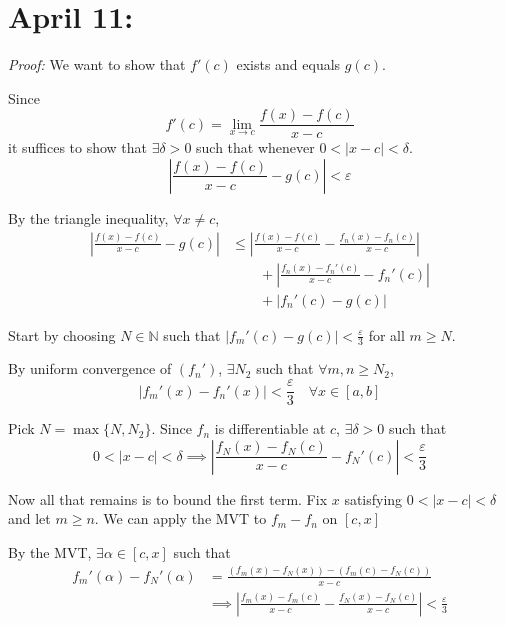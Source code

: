 \documentclass[12pt]{report}
\newcommand{\N}{\mathbb{N}}
\newcommand{\abs}[1]{\left\vert #1 \right\vert}
\newcommand{\ep}{\varepsilon}
\newenvironment*{tbox}[2][gray]{
    \begin{tcolorbox}[
        parbox=false,
        colback=#1!5!white,
        colframe=#1!75!black,
        breakable,
        title={#2}
    ]}
    {\end{tcolorbox}}
\begin{document}
\section{April 11:}
    \begin{tbox}{\textbf{Differentiable Limit Theorem:} Let $f_n \to f$ pointwise on the closed interval $[a, b]$ and assume that each $f_n$ is differentiable if $(f_n')$ converges uniformly on $[a, b]$ to a function $g$. Then $f$ is differentiable on $[a, b]$ and $f' = g$.}
        \emph{Proof:} We want to show that $f'(c)$ exists and equals $g(c)$. 

        Since 
        \[f'(c) = \lim_{x \to c} \frac{f(x) - f(c)}{x - c}\]
        it suffices to show that $\exists \delta > 0$ such that whenever $0 < \abs{x - c} < \delta$. 
        \[\abs{\frac{f(x) - f(c)}{x - c} - g(c)} < \ep\]

        By the triangle inequality, $\forall x\neq c$, 
        \begin{align*}
            \abs{\frac{f(x) - f(c)}{x - c} - g(c)} &\leq \abs{\frac{f(x) - f(c)}{x - c} - \frac{f_n(x) - f_n(c)}{x- c}}\\ 
            &\qquad + \abs{\frac{f_n(x) - f_n'(c)}{x - c} - f_n'(c)}\\ 
            &\qquad + \abs{f_n'(c) - g(c)}
        \end{align*}

        Start by choosing $N \in \N$ such that $\abs{f_m'(c) - g(c)} < \frac{\ep}{3}$ for all $m \geq N$.

        By uniform convergence of $(f_n')$, $\exists N_2$ such that $\forall m, n \geq N_2$, 
        \[\abs{f_m'(x) - f_n'(x)} < \frac{\ep}{3} \quad \forall x \in [a, b]\]

        Pick $N = \max\{N, N_2\}$. Since $f_n$ is differentiable at $c$, $\exists \delta > 0$ such that 
        \[0 < \abs{x - c} < \delta \implies \abs{\frac{f_N(x) - f_N(c)}{x- c} - f_N'(c)} < \frac{\ep}{3}\]

        Now all that remains is to bound the first term. Fix $x$ satisfying $0 < \abs{x - c} < \delta$ and let $m \geq n$. We can apply the MVT to $f_m - f_n$ on $[c, x]$ 

        By the MVT, $\exists \alpha \in [c, x]$ such that 
        \begin{align*}
            f_m'(\alpha) - f_N'(\alpha) &= \frac{(f_m(x) - f_N(x)) - (f_m(c) - f_N(c))}{x - c}\\ 
            &\implies \abs{\frac{f_m(x) - f_m(c)}{x - c}  -\frac{f_N(x) - f_N(c)}{x- c}} < \frac{\ep}{3}
        \end{align*}


\end{tbox}
\end{document}
